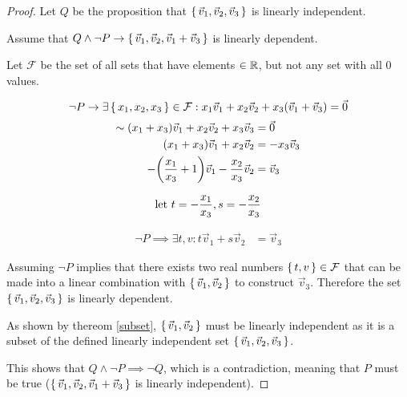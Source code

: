 \begin{proof}

	Let $Q$ be the proposition that $\set{\vec v_1, \vec v_2, \vec v_3}$ is linearly independent.

	Assume that $Q \wedge \neg P \rightarrow \set{\vec v_1, \vec v_2, \vec v_1 + \vec v_3}$ is linearly dependent.

	Let $\mathcal F$ be the set of all sets that have elements $\in {\mathbb R}$, but not any set with all 0 values.

	$$
		\neg P \rightarrow \exists \set{x_1,x_2,x_3} \in \mathcal F : x_1 \vec v_1 + x_2 \vec v_2 + x_3 { \left(\vec v_1 + \vec v_3\right) } = \vec 0
	$$
	\begin{align*}
		\sim
		{ \left(x_1 + x_3\right) } {\vec v_1} + x_2 \vec v_2 + x_3 \vec v_3    & = \vec 0         \\
		{ \left(x_1+x_3\right) }\vec v_1 + x_2\vec v_2                         & = - x_3 \vec v_3 \\
		-{ \left(\frac{x_1}{x_3} + 1\right) }\vec v_1 -\frac{x_2}{x_3}\vec v_2 & = \vec v_3
	\end{align*}

	$$
		{\text{let } } t = -\frac{x_1}{x_3}, s=-\frac{x_2}{x_3}
	$$

	\begin{align*}
		\neg P \implies \exists t,v : t\vec v_1 + s \vec v_2 & = \vec v_3
	\end{align*}

	Assuming $\neg P$ implies that there exists two real numbers $\set{t, v}\in \mathcal{F}$  that can be made into a linear combination with $\set{\vec v_1, \vec v_2}$ to construct $\vec v_3$.
	Therefore the set $\set{\vec v_1, \vec v_2, \vec v_3}$ is linearly dependent.

	As shown by thereom \ref{subset}, $\set{\vec v_1, \vec v_2}$ must be linearly independent as it is a subset of the defined linearly independent set $\set{\vec v_1, \vec v_2, \vec v_3}$.

	This shows that $Q\wedge \neg P \implies \neg Q$, which is a contradiction, meaning that $P$ must be true ($\set{\vec v_1,\vec v_2, \vec v_1+\vec v_3}$ is linearly independent).



\end{proof}
